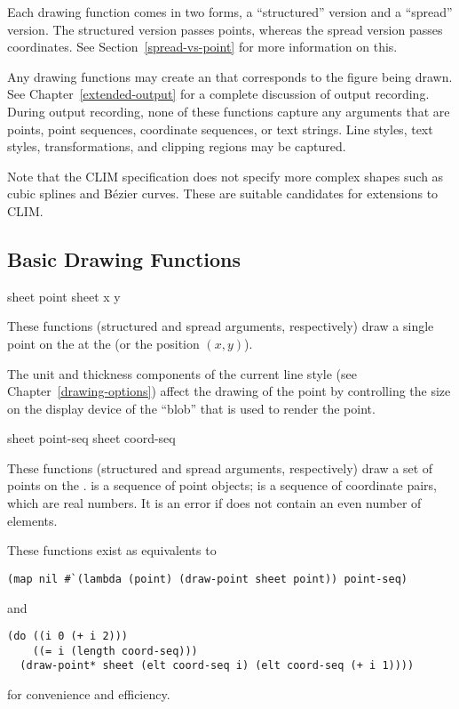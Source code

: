 Each drawing function comes in two forms, a ``structured'' version and a
``spread'' version.  The structured version passes points, whereas the spread
version passes coordinates.  See Section~\ref{spread-vs-point} for more
information on this.

Any drawing functions may create an  that corresponds to the
figure being drawn.  See Chapter~\ref{extended-output} for a complete discussion
of output recording.  During output recording, none of these functions capture
any arguments that are points, point sequences, coordinate sequences, or text
strings.  Line styles, text styles, transformations, and clipping regions may be
captured.

Note that the CLIM specification does not specify more complex shapes such as
cubic splines and B\'{e}zier curves.  These are suitable candidates for
extensions to CLIM.


\subsection {Basic Drawing Functions}

  {sheet point \key \DrawingOptions \PointOptions}
 {sheet x y   \key \DrawingOptions \PointOptions}

These functions (structured and spread arguments, respectively) draw a single
point on the   at the   (or the
position $(x,y)$).

The unit and thickness components of the current line style (see
Chapter~\ref{drawing-options}) affect the drawing of the point by controlling
the size on the display device of the ``blob'' that is used to render the point.


  {sheet point-seq \key \DrawingOptions \PointOptions}
 {sheet coord-seq \key \DrawingOptions \PointOptions}

These functions (structured and spread arguments, respectively) draw a set of
points on the  .   is a sequence of
point objects;  is a sequence of coordinate pairs, which are real
numbers.  It is an error if  does not contain an even number of
elements.

These functions exist as equivalents to
\begin{verbatim}
(map nil #`(lambda (point) (draw-point sheet point)) point-seq)
\end{verbatim}
and
\begin{verbatim}
(do ((i 0 (+ i 2)))
    ((= i (length coord-seq)))
  (draw-point* sheet (elt coord-seq i) (elt coord-seq (+ i 1))))
\end{verbatim}
for convenience and efficiency.


